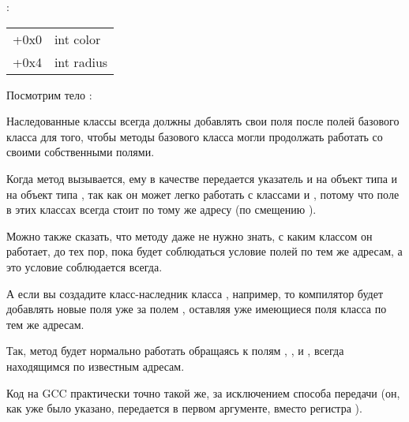:

\begin{center}
\begin{tabular}{ | l | l | }
\hline
  \tableheader{} \\
\hline
  +0x0 & int color \\
\hline
  +0x4 & int radius \\
\hline
\end{tabular}
\end{center}

Посмотрим тело \main:



Наследованные классы всегда должны добавлять свои поля после полей базового класса для того, чтобы методы
базового класса могли продолжать работать со своими собственными полями.


Когда метод  вызывается, ему в качестве  передается указатель и на объект типа  
и на объект типа , так как он может легко работать с классами  и , потому что поле  в этих
классах всегда стоит по тому же адресу (по смещению ).


Можно также сказать, что методу  даже не нужно знать,
с каким классом он работает, до тех пор, пока будет соблюдаться условие  полей по тем же адресам,
а это условие соблюдается всегда.


А если вы создадите класс-наследник класса , например, 
то компилятор будет добавлять новые поля уже за полем , оставляя уже имеющиеся поля класса  по тем же адресам.


Так, метод  будет нормально работать обращаясь к полям 
, ,  и , всегда находящимся по известным адресам.


Код на GCC практически точно такой же, за исключением способа передачи  (он, как уже было указано, 
передается в первом аргументе, вместо регистра \ECX).


